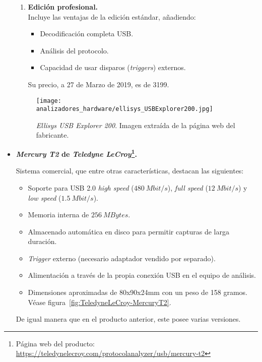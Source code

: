 \begin{itemize}
\begin{enumerate}
        \item \textbf{Edición profesional.} \\
        Incluye las ventajas de la edición estándar, añadiendo:
        \begin{itemize}
            \item Decodificación completa USB.
            \item Análisis del protocolo.
            \item Capacidad de usar disparos (\emph{triggers}) externos.
        \end{itemize}
        Su precio, a 27 de Marzo de 2019, es de 3199\texteuro.
    \end{enumerate}    
    \begin{figure}[htb]
        \centering
        \texttt{[image: analizadores\_hardware/ellisys\_USBExplorer200.jpg]}
        \caption{\emph{Ellisys USB Explorer 200}. Imagen extraída de la página web del fabricante.}
        \label{fig:ellisys-Explorer200}
    \end{figure}
    
    \item \textbf{\emph{Mercury T2} de \emph{Teledyne LeCroy}\footnote{Página web del producto: \url{https://teledynelecroy.com/protocolanalyzer/usb/mercury-t2}}.}
    
    Sistema comercial, que entre otras características\cite{teledynelecroy2014}, destacan las siguientes:
    \begin{itemize}
        \item Soporte para USB 2.0 \emph{high speed} ($480~Mbit/s$), \emph{full speed} ($12~Mbit/s$) y \emph{low speed} ($1.5~Mbit/s$).
        \item Memoria interna de $256~MBytes$.
        \item Almacenado automática en disco para permitir capturas de larga duración.
        \item \emph{Trigger} externo (necesario adaptador vendido por separado).
        \item Alimentación a través de la propia conexión USB en el equipo de análisis.
        \item Dimensiones aproximadas de 80x90x24mm con un peso de 158 gramos. Véase figura~\ref{fig:TeledyneLeCroy-MercuryT2}.
    \end{itemize}
    
    De igual manera que en el producto anterior, este posee varias versiones.


\end{itemize}
